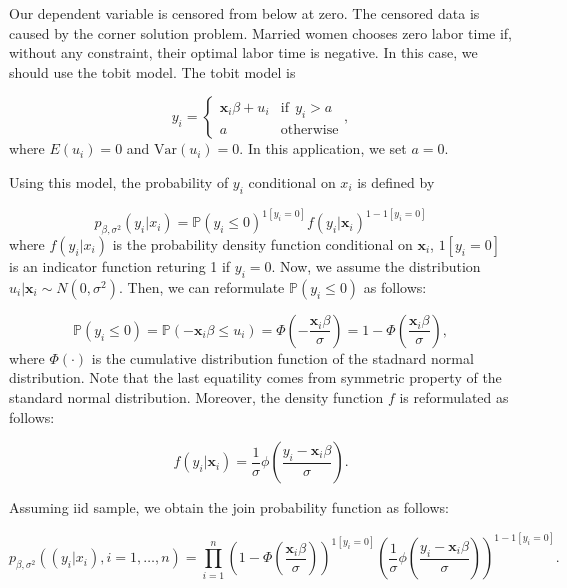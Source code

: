 \documentclass[
  12pt,
]{article}
\begin{document}
Our dependent variable is censored from below at zero. The censored data
is caused by the corner solution problem. Married women chooses zero
labor time if, without any constraint, their optimal labor time is
negative. In this case, we should use the tobit model. The tobit model
is

\begin{equation*}
  y_i = 
  \begin{cases}
    \mathbf{x}_i \beta + u_i &\mathrm{if}\:\: y_i > a  \\
    a                        &\mathrm{otherwise}
  \end{cases},
\end{equation*} where \(E(u_i) = 0\) and \(\mathrm{Var}(u_i) = 0\). In
this application, we set \(a = 0\).

Using this model, the probability of \(y_i\) conditional on \(x_i\) is
defined by

\begin{equation*}
  p_{\beta, \sigma^2}(y_i | x_i) = \mathbb{P}(y_i \le 0)^{1[y_i = 0]} f(y_i | \mathbf{x}_i)^{1 - 1[y_i = 0]}
\end{equation*} where \(f(y_i|x_i)\) is the probability density function
conditional on \(\mathbf{x}_i\), \(1[y_i = 0]\) is an indicator function
returing 1 if \(y_i = 0\). Now, we assume the distribution
\(u_i | \mathbf{x}_i \sim N(0, \sigma^2)\). Then, we can reformulate
\(\mathbb{P}(y_i \le 0)\) as follows:

\begin{equation*}
  \mathbb{P}(y_i \le 0) 
  = \mathbb{P}(-\mathbf{x}_i \beta \le u_i) 
  = \Phi \left( -\frac{\mathbf{x}_i \beta}{\sigma} \right)  
  = 1 - \Phi \left( \frac{\mathbf{x}_i \beta}{\sigma} \right),
\end{equation*} where \(\Phi(\cdot)\) is the cumulative distribution
function of the stadnard normal distribution. Note that the last
equatility comes from symmetric property of the standard normal
distribution. Moreover, the density function \(f\) is reformulated as
follows:

\begin{equation*}
  f(y_i | \mathbf{x}_i) = \frac{1}{\sigma} \phi \left( \frac{y_i - \mathbf{x}_i \beta}{\sigma} \right).
\end{equation*}

Assuming iid sample, we obtain the join probability function as follows:

\begin{equation*}
  p_{\beta, \sigma^2}((y_i | x_i), i = 1, \ldots, n) 
  = \prod_{i=1}^n \left(1 - \Phi \left( \frac{\mathbf{x}_i \beta}{\sigma} \right) \right)^{1[y_i = 0]} 
  \left( \frac{1}{\sigma} \phi \left( \frac{y_i - \mathbf{x}_i \beta}{\sigma} \right) \right)^{1 - 1[y_i = 0]}.
\end{equation*}
\end{document}

